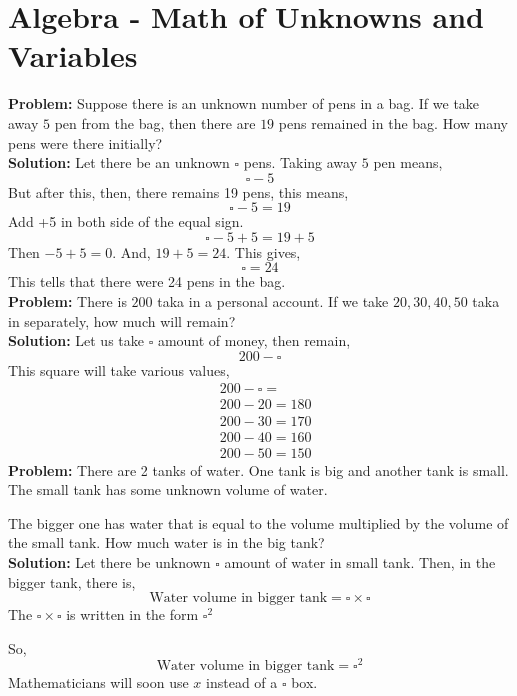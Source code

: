 \documentclass[10pt,a4paper]{article}
\begin{document}
\section{Algebra - Math of Unknowns and Variables}
\textbf{Problem:} Suppose there is an unknown number of pens in a bag. If we take away $5$ pen from the bag, then there are $19$ pens remained in the bag. How many pens were there initially? \\
\textbf{Solution:} Let there be an unknown $\square$ pens. Taking away $5$ pen means, 
\[ \square - 5 \]
But after this, then, there remains 19 pens, this means,
\[ \square - 5 = 19 \]
Add +5 in both side of the equal sign. 
\[ \square - 5 + 5 = 19 + 5 \]
Then $-5 +5 = 0$. And, $19 + 5 = 24$. This gives,
\[ \square = 24 \]
This tells that there were 24 pens in the bag. \\
\textbf{Problem:} There is $200$ taka in a personal account. If we take $20,30,40,50$ taka in separately, how much will remain? \\
\textbf{Solution:} Let us take $\square$ amount of money, then remain, 
\[ 200 - \square \]
This square will take various values, 
\begin{align*}
& 200 - \square = \\
& 200 - 20 = 180 \\
& 200 - 30 = 170 \\
& 200 - 40 = 160 \\
& 200 - 50 = 150 
\end{align*}
\textbf{Problem:} There are 2 tanks of water. One tank is big and another tank is small. The small tank has some unknown volume of water.

The bigger one has water that is equal to the volume multiplied by the volume of the small tank. How much water is in the big tank? \\
\textbf{Solution:} Let there be unknown $\square $ amount of water in small tank. Then, in the bigger tank, there is,
\[ \text{Water volume in bigger tank} = \square \times \square \]
The $\square \times \square$ is written in the form $\square ^2 $

So,
\[ \text{Water volume in bigger tank} =\square ^2 \]
Mathematicians will soon use $x$ instead of a $\square$ box.
\end{document}
